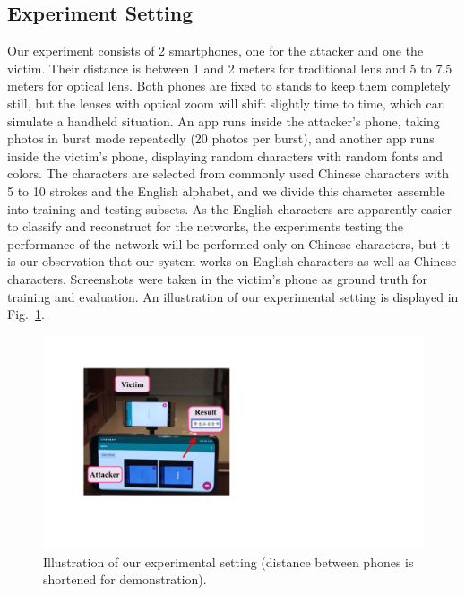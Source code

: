 \subsection{Experiment Setting}
\label{sec-experiment-setting}
Our experiment consists of 2 smartphones, one for the attacker and one the victim. Their distance is between 1 and 2 meters for traditional lens and 5 to 7.5 meters for optical lens. Both phones are fixed to stands to keep them completely still, but the lenses with optical zoom will shift slightly time to time, which can simulate a handheld situation. An app runs inside the attacker's phone, taking photos in burst mode repeatedly (20 photos per burst), and another app runs inside the victim's phone, displaying random characters with random fonts and colors. The characters are selected from commonly used Chinese characters with 5 to 10 strokes and the English alphabet, and we divide this character assemble into training and testing subsets. As the English characters are apparently easier to classify and reconstruct for the networks, the experiments testing the performance of the network will be performed only on Chinese characters, but it is our observation that our system works on English characters as well as Chinese characters. Screenshots were taken in the victim's phone as ground truth for training and evaluation. An illustration of our experimental setting is displayed in Fig.~\ref{illustration_of_system}.
\begin{figure}
	\centering
	\includegraphics[width=0.80\linewidth]{pic/setup.pdf}
    \caption{Illustration of our experimental setting (distance between phones is shortened for demonstration).}
	\label{illustration_of_system}
\end{figure}

